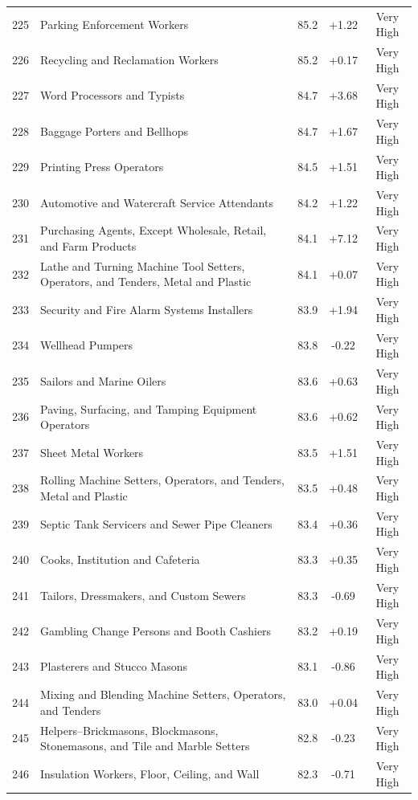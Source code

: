 {\begin{longtable}{rp{7cm}ccc}
225 & Parking Enforcement Workers & 85.2 & +1.22 & Very High \\
226 & Recycling and Reclamation Workers & 85.2 & +0.17 & Very High \\
227 & Word Processors and Typists & 84.7 & +3.68 & Very High \\
228 & Baggage Porters and Bellhops & 84.7 & +1.67 & Very High \\
229 & Printing Press Operators & 84.5 & +1.51 & Very High \\
230 & Automotive and Watercraft Service Attendants & 84.2 & +1.22 & Very High \\
231 & Purchasing Agents, Except Wholesale, Retail, and Farm Products & 84.1 & +7.12 & Very High \\
232 & Lathe and Turning Machine Tool Setters, Operators, and Tenders, Metal and Plastic & 84.1 & +0.07 & Very High \\
233 & Security and Fire Alarm Systems Installers & 83.9 & +1.94 & Very High \\
234 & Wellhead Pumpers & 83.8 & -0.22 & Very High \\
235 & Sailors and Marine Oilers & 83.6 & +0.63 & Very High \\
236 & Paving, Surfacing, and Tamping Equipment Operators & 83.6 & +0.62 & Very High \\
237 & Sheet Metal Workers & 83.5 & +1.51 & Very High \\
238 & Rolling Machine Setters, Operators, and Tenders, Metal and Plastic & 83.5 & +0.48 & Very High \\
239 & Septic Tank Servicers and Sewer Pipe Cleaners & 83.4 & +0.36 & Very High \\
240 & Cooks, Institution and Cafeteria & 83.3 & +0.35 & Very High \\
241 & Tailors, Dressmakers, and Custom Sewers & 83.3 & -0.69 & Very High \\
242 & Gambling Change Persons and Booth Cashiers & 83.2 & +0.19 & Very High \\
243 & Plasterers and Stucco Masons & 83.1 & -0.86 & Very High \\
244 & Mixing and Blending Machine Setters, Operators, and Tenders & 83.0 & +0.04 & Very High \\
245 & Helpers--Brickmasons, Blockmasons, Stonemasons, and Tile and Marble Setters & 82.8 & -0.23 & Very High \\
246 & Insulation Workers, Floor, Ceiling, and Wall & 82.3 & -0.71 & Very High \\

\end{longtable}}
